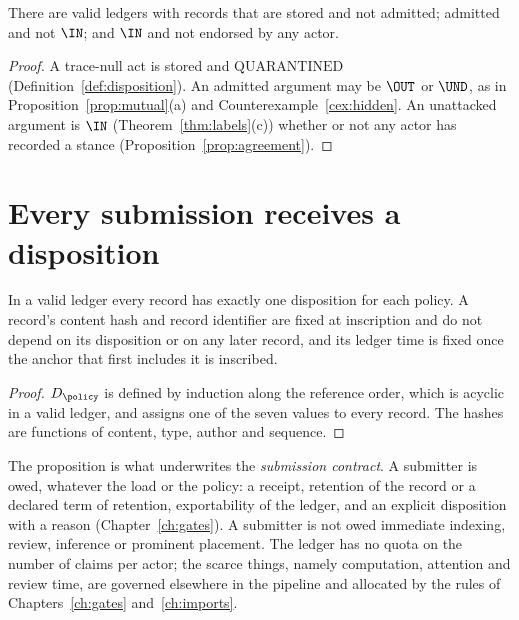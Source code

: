 \begin{proposition}\label{prop:stored}
There are valid ledgers with records that are stored and not admitted; admitted and not $\IN$; and $\IN$ and not endorsed by any actor.
\end{proposition}

\begin{proof}
A trace-null act is stored and $\mathrm{QUARANTINED}$ (Definition~\ref{def:disposition}). An admitted argument may be $\OUT$ or $\UND$, as in Proposition~\ref{prop:mutual}(a) and Counterexample~\ref{cex:hidden}. An unattacked argument is $\IN$ (Theorem~\ref{thm:labels}(c)) whether or not any actor has recorded a stance (Proposition~\ref{prop:agreement}).
\end{proof}

\section{Every submission receives a disposition}\label{sec:totality}

\begin{proposition}\label{prop:totality}
In a valid ledger every record has exactly one disposition for each policy. A record's content hash and record identifier are fixed at inscription and do not depend on its disposition or on any later record, and its ledger time is fixed once the anchor that first includes it is inscribed.
\end{proposition}

\begin{proof}
$D_\policy$ is defined by induction along the reference order, which is acyclic in a valid ledger, and assigns one of the seven values to every record. The hashes are functions of content, type, author and sequence.
\end{proof}

The proposition is what underwrites the \emph{submission contract}. A submitter is owed, whatever the load or the policy: a receipt, retention of the record or a declared term of retention, exportability of the ledger, and an explicit disposition with a reason (Chapter~\ref{ch:gates}). A submitter is not owed immediate indexing, review, inference or prominent placement. The ledger has no quota on the number of claims per actor; the scarce things, namely computation, attention and review time, are governed elsewhere in the pipeline and allocated by the rules of Chapters~\ref{ch:gates} and~\ref{ch:imports}.

